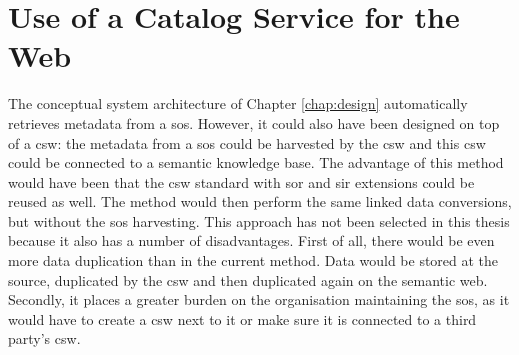 \section{Use of a Catalog Service for the Web}
\label{useCSW}
The conceptual system architecture of Chapter \ref{chap:design} automatically retrieves metadata from a \ac{sos}. However, it could also have been designed on top of a \ac{csw}: the metadata from a \ac{sos} could be harvested by the \ac{csw} and this \ac{csw} could be connected to a semantic knowledge base. The advantage of this method would have been that the \ac{csw} standard with \ac{sor} and \ac{sir} extensions could be reused as well. The method would then perform the same linked data conversions, but without the \ac{sos} harvesting. This approach has not been selected in this thesis because it also has a number of disadvantages. First of all, there would be even more data duplication than in the current method. Data would be stored at the source, duplicated by the \ac{csw} and then duplicated again on the semantic web. Secondly, it places a greater burden on the organisation maintaining the \ac{sos}, as it would have to create a \ac{csw} next to it or make sure it is connected to a third party's \ac{csw}.  